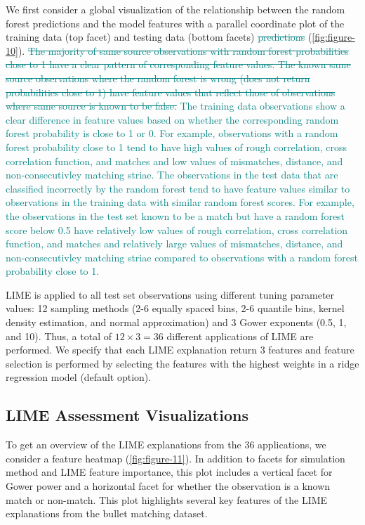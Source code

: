 \documentclass[AMS,STIX2COL]{WileyNJD-v2}\usepackage[]{graphicx}\usepackage[]{color}
\newcommand{\kge}[1]{\textcolor{teal}{#1}}
\begin{document}
We first consider a global visualization of the relationship between the random forest predictions and the model features with a parallel coordinate plot of the training data (top facet) and testing data (bottom facets) \kge{\sout{predictions}} (\autoref{fig:figure-10}). \kge{\sout{The majority of same source observations with random forest probabilities close to 1 have a clear pattern of corresponding feature values. The known same source observations where the random forest is wrong (does not return probabilities close to 1) have feature values that reflect those of observations where same source is known to be false.}} \kge{The training data observations show a clear difference in feature values based on whether the corresponding random forest probability is close to 1 or 0. For example, observations with a random forest probability close to 1 tend to have high values of rough correlation, cross correlation function, and matches and low values of mismatches, distance, and non-consecutivley matching striae. The observations in the test data that are classified incorrectly by the random forest tend to have feature values similar to observations in the training data with similar random forest scores. For example, the observations in the test set known to be a match but have a random forest score below 0.5 have relatively low values of rough correlation, cross correlation function, and matches and relatively large values of mismatches, distance, and non-consecutivley matching striae compared to observations with a random forest probability close to 1.} 

LIME is applied to all test set observations using different tuning parameter values: 12 sampling methods (2-6 equally spaced bins, 2-6 quantile bins, kernel density estimation, and normal approximation) and 3 Gower exponents (0.5, 1, and 10). Thus, a total of $12\times 3=36$ different applications of LIME are performed. We specify that each LIME explanation return 3 features and feature selection is performed by selecting the features with the highest weights in a ridge regression model (default option).







\subsection{LIME Assessment Visualizations} \label{bullet-assess-ex}

To get an overview of the LIME explanations from the 36 applications, we consider a feature heatmap (\autoref{fig:figure-11}). In addition to facets for simulation method and LIME feature importance, this plot includes a vertical facet for Gower power and a horizontal facet for whether the observation is a known match or non-match. This plot highlights several key features of the LIME explanations from the bullet matching dataset.
\end{document}
